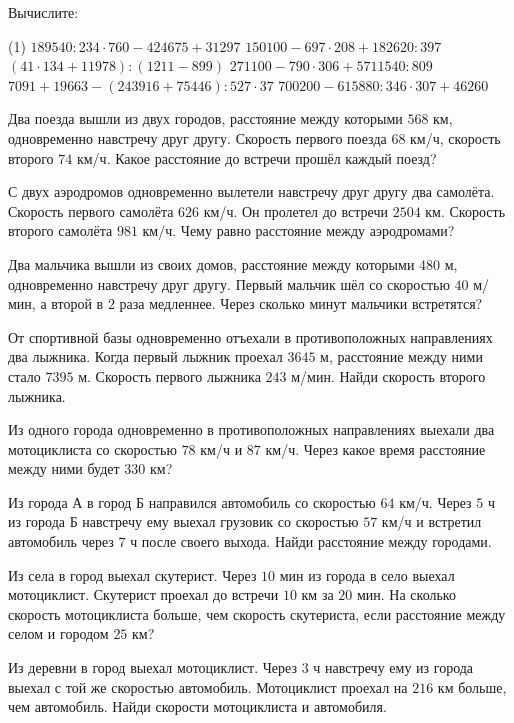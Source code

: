 \begin{class}[number=7]
	\begin{listofex}
		\item Вычислите: 
		\begin{tasks}(1)
			\task \( 189 540 : 234 \cdot 760 - 424 675 + 31 297  \)
			\task \( 150 100 - 697 \cdot 208 + 182620 : 397  \)
			\task \( ( 41 \cdot 134 + 11 978 ) : ( 1 211 - 899 )  \)
			\task \( 271 100 - 790 \cdot 306 + 5 711 540 : 809  \)
			\task \( 7 091 + 19 663 - ( 243 916 + 75 446 ) : 527 \cdot 37 \)
			\task \( 700 200 - 615 880 : 346 \cdot 307 + 46 260  \)
		\end{tasks}
		\item Два поезда вышли из двух городов, расстояние между которыми \( 568 \) км, одновременно навстречу друг другу. Скорость первого поезда \( 68 \) км/ч, скорость второго \( 74 \) км/ч. Какое расстояние до встречи прошёл каждый поезд?
		\item С двух аэродромов одновременно вылетели навстречу друг другу два самолёта. Скорость первого самолёта \( 626 \) км/ч. Он пролетел до встречи \( 2504 \) км. Скорость второго самолёта \( 981 \) км/ч. Чему равно расстояние между аэродромами?
		\item Два мальчика вышли из своих домов, расстояние между которыми \( 480 \) м, одновременно навстречу друг другу. Первый мальчик шёл со скоростью \( 40 \) м/мин, а второй в \( 2 \) раза медленнее. Через сколько минут мальчики встретятся?
		\item От спортивной базы одновременно отъехали в противоположных направлениях два лыжника. Когда первый лыжник проехал \( 3645 \) м, расстояние между ними стало \( 7395 \) м. Скорость первого лыжника \( 243 \) м/мин. Найди скорость второго лыжника.
		\item Из одного города одновременно в противоположных направлениях выехали два мотоциклиста со скоростью \( 78 \) км/ч и \( 87 \) км/ч. Через какое время расстояние между ними будет \( 330 \) км?
		\item Из города А в город Б направился автомобиль со скоростью \( 64 \) км/ч. Через \( 5 \) ч из города Б навстречу ему выехал грузовик со скоростью \( 57 \) км/ч и встретил автомобиль через \( 7 \) ч после своего выхода. Найди расстояние между городами.
		\item Из села в город выехал скутерист. Через \( 10 \) мин из города в село выехал мотоциклист. Скутерист проехал до встречи \( 10 \) км за \( 20 \) мин. На сколько скорость мотоциклиста больше, чем скорость скутериста, если расстояние между селом и городом \( 25 \) км?
		\item Из деревни в город выехал мотоциклист. Через \( 3 \) ч навстречу ему из города выехал с той же скоростью автомобиль. Мотоциклист проехал на \( 216 \) км больше, чем автомобиль. Найди скорости мотоциклиста и автомобиля.
	\end{listofex}
\end{class}

